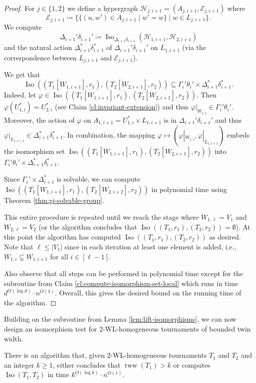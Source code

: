 \documentclass{theoretics}
\newcommand{\CE}{{\mathcal E}}
\newcommand{\CH}{{\mathcal H}}
\DeclareMathOperator{\Iso}{Iso}
\DeclareMathOperator{\tww}{tww}
\begin{document}
\begin{proof}
 For $j \in \{1,2\}$ we define a hypergraph $\CH_{j,i+1} = (A_{j,i+1},\CE_{j,i+1})$ where
 \[\CE_{j,i+1} \coloneqq \{\{(u,w') \in A_{j,i+1} \mid w' = w\} \mid w \in L_{j,i+1}\}.\]
 We compute
 \[\Delta_{i+1}'\delta_{i+1}' \coloneqq \Iso_{\Delta_{i+1}\delta_{i+1}}(\CH_{1,i+1},\CH_{2,i+1})\]
 and the natural action $\Delta_{i+1}^*\delta_{i+1}^*$ of $\Delta_{i+1}'\delta_{i+1}'$ on $L_{1,i+1}$ (via the correspondence between $L_{j,i+1}$ and $\CE_{j,{i+1}}$).

 We get that
 \[\Iso((T_1[W_{1,i+1}],r_1),(T_2[W_{2,i+1}],r_2)) \subseteq \Gamma_i'\theta_i' \times \Delta_{i+1}^*\delta_{i+1}^*.\]
 Indeed, let $\varphi\in \Iso((T_1[W_{1,i+1}],r_1),(T_2[W_{2,i+1}],r_2))$.
 Then $\varphi(U_{1,i}^*) = U_{2,i}^*$ (see Claim \ref{cl:invariant-extension}) and thus $\varphi|_{W_{1,i}} \in \Gamma_i'\theta_i'$.
 Moreover, the action of $\varphi$ on $A_{1,i+1} = U_{1,i}^* \times L_{1,i+1}$ is in $\Delta_{i+1}'\delta_{i+1}'$ and thus $\varphi|_{L_{1,i+1}} \in \Delta_{i+1}^*\delta_{i+1}^*$.
 In combination, the mapping $\varphi\mapsto (\varphi|_{W_{1,i}},\varphi|_{L_{1,i+1}})$ embeds the isomorphism set $\Iso((T_1[W_{1,i+1}],r_1),(T_2[W_{2,i+1}],r_2))$ into $\Gamma_i'\theta_i' \times \Delta_{i+1}^*\delta_{i+1}^*$.

 Since $\Gamma_i' \times \Delta_{i+1}^*$ is solvable, we can compute $\Iso((T_1[W_{1,i+1}],r_1),(T_2[W_{2,i+2}],r_2))$ in polynomial time using Theorem \ref{thm:gi-solvable-group}.

 This entire procedure is repeated until we reach the stage where $W_{1,\ell} = V_1$ and $W_{2,\ell} = V_2$ (or the algorithm concludes that $\Iso((T_1,r_1),(T_2,r_2)) = \emptyset$).
 At this point the algorithm has computed $\Iso((T_1,r_1),(T_2,r_2))$ as desired.
 Note that $\ell \leq |V_1|$ since in each iteration at least one element is added, i.e., $W_{1,i} \subsetneq W_{1,i+1}$ for all $i \in [\ell-1]$.

 Also observe that all steps can be performed in polynomial time except for the subroutine from Claim \ref{cl:compute-isomorphism-set-local} which runs in time $d^{O(\log d)} \cdot n^{O(1)}$.
 Overall, this gives the desired bound on the running time of the algorithm.
\end{proof}

Building on the subroutine from Lemma \ref{lem:lift-isomorphisms}, we can now design an isomorphism test for $2$-WL-homogeneous tournaments of bounded twin width.

\begin{lemma}
 \label{lem:tww-isomorphism-unicolored}
 There is an algorithm that, given $2$-WL-homogeneous tournaments $T_1$ and $T_2$ and an integer $k \geq 1$, either concludes that $\tww(T_1) > k$ or computes $\Iso(T_1,T_2)$ in time $k^{O(\log k)} \cdot n^{O(1)}$.
\end{lemma}
\end{document}
